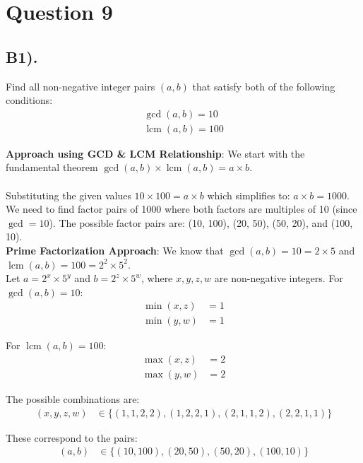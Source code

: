 \documentclass[12pt]{article}
\begin{document}
\section*{Question 9}
\subsection*{B1).}

Find all non-negative integer pairs $(a, b)$ that satisfy both of the following conditions:
\begin{gather*}
    \gcd(a, b) = 10 \\
    \operatorname{lcm}(a, b) = 100
\end{gather*}

\textbf{Approach using GCD \& LCM Relationship}: We start with the fundamental theorem $\gcd(a, b) \times \operatorname{lcm}(a, b) = a \times b$. \\ \\
Substituting the given values $10 \times 100 = a \times b$ which simplifies to: $a \times b = 1000$.
We need to find factor pairs of 1000 where both factors are multiples of 10 (since $\gcd = 10$).
The possible factor pairs are: (10, 100), (20, 50), (50, 20), and (100, 10). \\

\textbf{Prime Factorization Approach}: We know that $\gcd(a, b) = 10 = 2 \times 5$ and $\operatorname{lcm}(a, b) = 100 = 2^2 \times 5^2$. \\

Let $a = 2^x \times 5^y$ and $b = 2^z \times 5^w$, where $x, y, z, w$ are non-negative integers.
For $\gcd(a, b) = 10$:
\begin{align*}
    \min(x, z) &= 1 \\
    \min(y, w) &= 1
\end{align*}

For $\operatorname{lcm}(a, b) = 100$:
\begin{align*}
    \max(x, z) &= 2 \\
    \max(y, w) &= 2
\end{align*}

The possible combinations are:
\begin{align*}
    (x, y, z, w) &\in \{(1, 1, 2, 2), (1, 2, 2, 1), (2, 1, 1, 2), (2, 2, 1, 1)\}
\end{align*}

These correspond to the pairs:
\begin{align*}
    (a, b) &\in \{(10, 100), (20, 50), (50, 20), (100, 10)\}
\end{align*}
\end{document}
